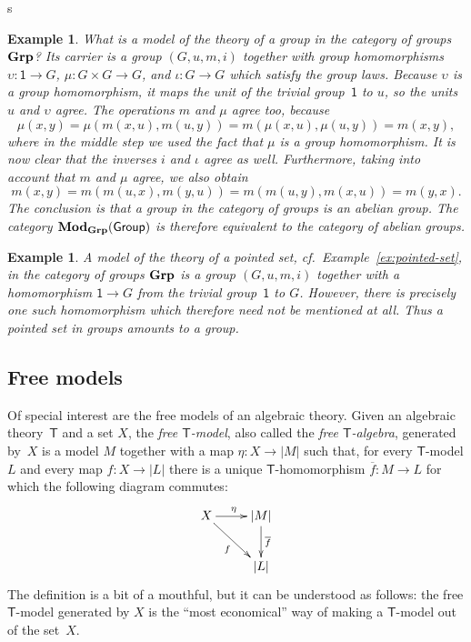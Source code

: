 s\documentclass{amsart}
\newcommand{\theory}[1]{\mathsf{#1}} %
\newcommand{\ModC}[2]{\text{\textbf{Mod}}_{\category{#1}}(\theory{#2})} %
\newcommand{\category}[1]{\text{\textbf{#1}}} %
\newcommand{\carrier}[1]{|#1|} %
\newcommand{\one}{\mathsf{1}} %
\newtheorem{example}[definition]{Example}
\begin{document}
\begin{example}
  What is a model of the theory of a group in the category of groups $\category{Grp}$? Its
  carrier is a group $(G, u, m, i)$ together with group homomorphisms
  $\upsilon : \one \to G$, $\mu : G \times G \to G$, and $\iota : G \to G$ which satisfy
  the group laws. Because $\upsilon$ is a group homomorphism, it maps the unit of the
  trivial group~$\one$ to $u$, so the units $u$ and $\upsilon$ agree. The operations $m$
  and $\mu$ agree too, because
  \begin{equation*}
    \mu(x, y) =
    \mu(m(x, u), m(u, y)) =
    m(\mu(x, u), \mu(u, y)) =
    m(x, y),
  \end{equation*}
  where in the middle step we used the fact that $\mu$ is a group homomorphism. It is now
  clear that the inverses $i$ and $\iota$ agree as well. Furthermore, taking into account
  that $m$ and $\mu$ agree, we also obtain
  \begin{equation*}
    m(x, y) =
    m(m(u, x), m(y, u)) =
    m(m(u, y), m(x, u)) =
    m(y, x).
  \end{equation*}
  The conclusion is that a group in the category of groups is an abelian group. The
  category $\ModC{Grp}{Group}$ is therefore equivalent to the category of abelian groups.
\end{example}

\begin{example}
  A model of the theory of a pointed set, cf.\ Example~\ref{ex:pointed-set}, in the
  category of groups $\category{Grp}$ is a group $(G, u, m, i)$ together with a
  homomorphism $\one \to G$ from the trivial group~$\one$ to $G$. However, there is
  precisely one such homomorphism which therefore need not be mentioned at all. Thus a
  pointed set in groups amounts to a group.
\end{example}


\subsection{Free models}
\label{sec:free-models}

Of special interest are the free models of an algebraic theory. Given an
algebraic theory~$\theory{T}$ and a set $X$, the \emph{free $\theory{T}$-model},
also called the \emph{free $\theory{T}$-algebra}, generated by~$X$ is a model
$M$ together with a map $\eta : X \to \carrier{M}$ such that, for every
$\theory{T}$-model $L$ and every map $f : X \to \carrier{L}$ there is a unique
$\theory{T}$-homomorphism $\overline{f} : M \to L$ for which the following
diagram commutes:
%
\begin{equation*}
  \xymatrix{
    {X}
    \ar[r]^{\eta}
    \ar[rd]_{f}
    &
    {\carrier{M}}
    \ar[d]^{\overline{f}}
    \\
    &
     \carrier{L}
  }
\end{equation*}
%
The definition is a bit of a mouthful, but it can be understood as follows: the
free $\theory{T}$-model generated by $X$ is the ``most economical'' way of
making a $\theory{T}$-model out of the set~$X$.
\end{document}
